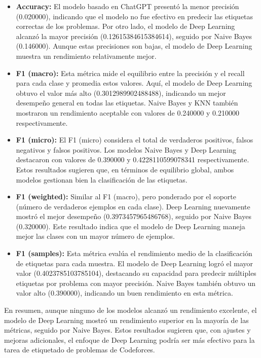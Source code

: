 \documentclass{article}
\begin{document}
\begin{itemize}
    \item \textbf{Accuracy:} El modelo basado en ChatGPT presentó la menor precisión (0.020000), indicando que el modelo no fue efectivo en predecir las etiquetas correctas de los problemas. Por otro lado, el modelo de Deep Learning alcanzó la mayor precisión (0.12615384615384614), seguido por Naive Bayes (0.146000). Aunque estas precisiones son bajas, el modelo de Deep Learning muestra un rendimiento relativamente mejor.
          
    \item \textbf{F1 (macro):} Esta métrica mide el equilibrio entre la precisión y el recall para cada clase y promedia estos valores. Aquí, el modelo de Deep Learning obtuvo el valor más alto (0.3012989902488488), indicando un mejor desempeño general en todas las etiquetas. Naive Bayes y KNN también mostraron un rendimiento aceptable con valores de 0.240000 y 0.210000 respectivamente.
          
    \item \textbf{F1 (micro):} El F1 (micro) considera el total de verdaderos positivos, falsos negativos y falsos positivos. Los modelos Naive Bayes y Deep Learning destacaron con valores de 0.390000 y 0.4228110599078341 respectivamente. Estos resultados sugieren que, en términos de equilibrio global, ambos modelos gestionan bien la clasificación de las etiquetas.
          
    \item \textbf{F1 (weighted):} Similar al F1 (macro), pero ponderado por el soporte (número de verdaderos ejemplos en cada clase). Deep Learning nuevamente mostró el mejor desempeño (0.3973457965486768), seguido por Naive Bayes (0.320000). Este resultado indica que el modelo de Deep Learning maneja mejor las clases con un mayor número de ejemplos.
          
    \item \textbf{F1 (samples):} Esta métrica evalúa el rendimiento medio de la clasificación de etiquetas para cada muestra. El modelo de Deep Learning logró el mayor valor (0.4023785103785104), destacando su capacidad para predecir múltiples etiquetas por problema con mayor precisión. Naive Bayes también obtuvo un valor alto (0.390000), indicando un buen rendimiento en esta métrica.
          
\end{itemize}

En resumen, aunque ninguno de los modelos alcanzó un rendimiento excelente, el modelo de Deep Learning mostró un rendimiento superior en la mayoría de las métricas, seguido por Naive Bayes. Estos resultados sugieren que, con ajustes y mejoras adicionales, el enfoque de Deep Learning podría ser más efectivo para la tarea de etiquetado de problemas de Codeforces.
\end{document}
